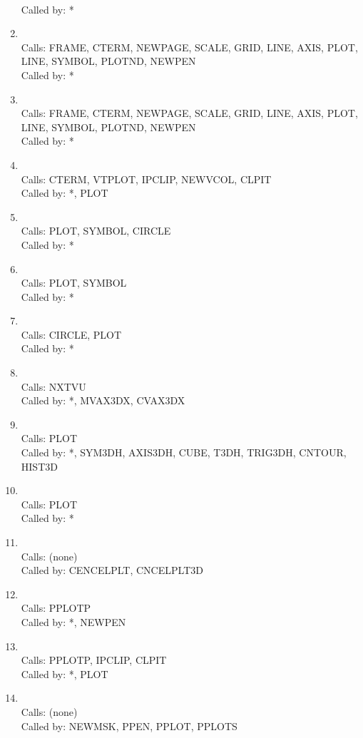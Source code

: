 \documentclass[11pt]{report}
\begin{document}
\begin{enumerate}
\\ Called by: *
\item {}
\\ Calls:  FRAME, CTERM, NEWPAGE, SCALE, GRID, LINE, AXIS, PLOT, 
LINE, SYMBOL, PLOTND, NEWPEN
\\ Called by: *
\item {}
\\ Calls:  FRAME, CTERM, NEWPAGE, SCALE, GRID, LINE, AXIS, PLOT, 
LINE, SYMBOL, PLOTND, NEWPEN
\\ Called by: *
\item {}
\\ Calls:  CTERM, VTPLOT, IPCLIP, NEWVCOL, CLPIT
\\ Called by: *, PLOT
\item {}
\\ Calls:  PLOT, SYMBOL, CIRCLE
\\ Called by: *
\item {}
\\ Calls:  PLOT, SYMBOL
\\ Called by: *
\item {}
\\ Calls:  CIRCLE, PLOT
\\ Called by: *
\item {}
\\ Calls:  NXTVU
\\ Called by: *, MVAX3DX, CVAX3DX
\item {}
\\ Calls:  PLOT
\\ Called by: *, SYM3DH, AXIS3DH, CUBE, T3DH, TRIG3DH, CNTOUR, HIST3D
\item {}
\\ Calls:  PLOT
\\ Called by: *
\item {}
\\ Calls:  (none)
\\ Called by: CENCELPLT, CNCELPLT3D
\item {}
\\ Calls:  PPLOTP
\\ Called by: *, NEWPEN
\item {}
\\ Calls:  PPLOTP, IPCLIP, CLPIT
\\ Called by: *, PLOT
\item {}
\\ Calls:  (none)
\\ Called by: NEWMSK, PPEN, PPLOT, PPLOTS

\end{enumerate}
\end{document}
